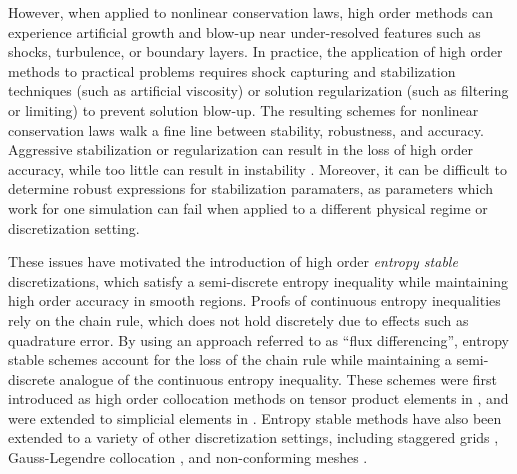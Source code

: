 \documentclass{svjour3}                     %
\begin{document}
However, when applied to nonlinear conservation laws, high order methods can experience artificial growth and blow-up near under-resolved features such as shocks, turbulence, or boundary layers.  In practice, the application of high order methods to practical problems requires shock capturing and stabilization techniques (such as artificial viscosity) or solution regularization (such as filtering or limiting) to prevent solution blow-up.  The resulting schemes for nonlinear conservation laws walk a fine line between stability, robustness, and accuracy.  Aggressive stabilization or regularization can result in the loss of high order accuracy, while too little can result in instability \cite{wang2013high}.  Moreover, it can be difficult to determine robust expressions for stabilization paramaters, as parameters which work for one simulation can fail when applied to a different physical regime or discretization setting.  

These issues have motivated the introduction of high order \textit{entropy stable} discretizations, which satisfy a semi-discrete entropy inequality while maintaining high order accuracy in smooth regions.  Proofs of continuous entropy inequalities rely on the chain rule, which does not hold discretely due to effects such as quadrature error.   By using an approach referred to as ``flux differencing'', entropy stable schemes account for the loss of the chain rule while maintaining a semi-discrete analogue of the continuous entropy inequality.  These schemes were first introduced as high order collocation methods on tensor product elements in \cite{fisher2013high, carpenter2014entropy, gassner2016split, gassner2017br1}, and were extended to simplicial elements in \cite{crean2017high, chen2017entropy, crean2018entropy, chan2017discretely, chan2018discretely}.  Entropy stable methods have also been extended to a variety of other discretization settings, including staggered grids \cite{parsani2016entropy}, Gauss-Legendre collocation \cite{chan2018efficient}, and non-conforming meshes \cite{friedrich2017entropy}.  
\end{document}
